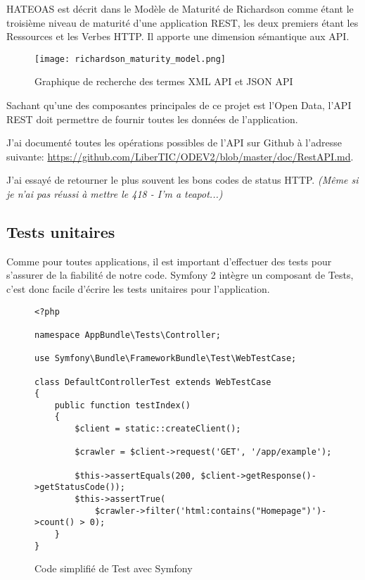 HATEOAS est décrit dans le Modèle de Maturité de Richardson  comme étant le troisième niveau de maturité d'une application REST, les deux premiers étant les Ressources et les Verbes HTTP. Il apporte une dimension sémantique aux API.

\begin{figure}[H]
\begin{center}
\texttt{[image: richardson\_maturity\_model.png]}
\end{center}
\caption{Graphique de recherche des termes XML API et JSON API}
\end{figure}

Sachant qu'une des composantes principales de ce projet est l'Open Data, l'API REST doit permettre de fournir toutes les données de l'application.

J'ai documenté toutes les opérations possibles de l'API sur Github à l'adresse suivante: \url{https://github.com/LiberTIC/ODEV2/blob/master/doc/RestAPI.md}.

J'ai essayé de retourner le plus souvent les bons codes de status HTTP. \textit{(Même si je n'ai pas réussi à mettre le 418 - I'm a teapot...)}

\subsection{Tests unitaires}

Comme pour toutes applications, il est important d'effectuer des tests pour s'assurer de la fiabilité de notre code. Symfony 2 intègre un composant de Tests, c'est donc facile d'écrire les tests unitaires pour l'application.

\begin{figure}[H]
\begin{lstlisting}[frame=single]
<?php

namespace AppBundle\Tests\Controller;

use Symfony\Bundle\FrameworkBundle\Test\WebTestCase;

class DefaultControllerTest extends WebTestCase
{
    public function testIndex()
    {
        $client = static::createClient();

        $crawler = $client->request('GET', '/app/example');

        $this->assertEquals(200, $client->getResponse()->getStatusCode());
        $this->assertTrue(
            $crawler->filter('html:contains("Homepage")')->count() > 0);
    }
}

\end{lstlisting}
\caption{Code simplifié de Test avec Symfony}
\end{figure}


